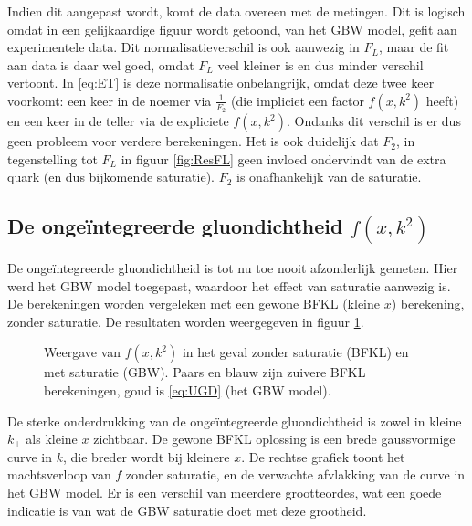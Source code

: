 \documentclass[a4paper,11pt]{article}
\numberwithin{equation}{section} %
\begin{document}
Indien dit aangepast wordt, komt de data overeen met de metingen.
Dit is logisch omdat in \cite[p. 55]{GB} een gelijkaardige figuur wordt getoond, van het GBW model, gefit aan experimentele data.
Dit normalisatieverschil is ook aanwezig in $F_L$, maar de fit aan data is daar wel goed, omdat $F_L$  veel kleiner is en dus minder verschil vertoont.
In \eqref{eq:ET} is deze normalisatie onbelangrijk, omdat deze twee keer voorkomt: een keer in de noemer via $\frac{1}{F_2}$ (die impliciet een factor $f(x,k^2)$ heeft) en een keer in de teller via de expliciete $f(x,k^2)$.
Ondanks dit verschil is er dus geen probleem voor verdere berekeningen.
Het is ook duidelijk dat $F_2$, in tegenstelling tot $F_L$ in figuur \ref{fig:ResFL} geen invloed ondervindt van de extra quark (en dus bijkomende saturatie).
$F_2$ is onafhankelijk van de saturatie.

  \subsection{De ongeïntegreerde gluondichtheid $f(x,k^2)$} \label{sec:ResUGD}
De ongeïntegreerde gluondichtheid is tot nu toe nooit afzonderlijk gemeten.
Hier werd het GBW model toegepast, waardoor het effect van saturatie aanwezig is.
De berekeningen worden vergeleken met een gewone BFKL (kleine $x$) berekening, zonder saturatie.
De resultaten worden weergegeven in figuur \ref{fig:ResUGD}.
\begin{figure} [H]
\centering
{}
\caption{Weergave van $f(x,k^2)$ in het geval zonder saturatie (BFKL) en met saturatie (GBW). Paars en blauw zijn zuivere BFKL berekeningen, goud is \eqref{eq:UGD} (het GBW model).}
\label{fig:ResUGD}
\end{figure}
De sterke onderdrukking van de ongeïntegreerde gluondichtheid is zowel in kleine $k_\perp$ als kleine $x$ zichtbaar.
De gewone BFKL oplossing is een brede gaussvormige curve in $k$, die breder wordt bij kleinere $x$.
De rechtse grafiek toont het machtsverloop van $f$ zonder saturatie, en de verwachte afvlakking van de curve  in het GBW model.
Er is een verschil van meerdere grootteordes, wat een goede indicatie is van wat de GBW saturatie doet met deze grootheid.
\end{document}
